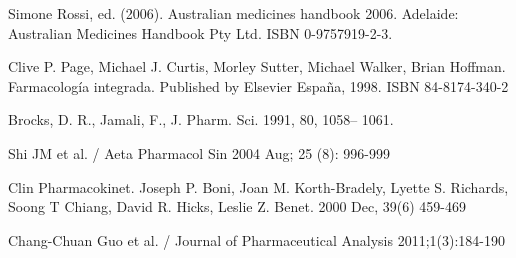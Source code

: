 \documentclass[12pt]{article} %
\begin{document}
\newpage

\begin{thebibliography}{100}
	Simone Rossi, ed. (2006).  Australian medicines handbook 2006. Adelaide: Australian Medicines Handbook Pty Ltd. ISBN 0-9757919-2-3.

	Clive P. Page, Michael J. Curtis, Morley Sutter, Michael Walker, Brian Hoffman. Farmacología integrada. Published by Elsevier España, 1998. ISBN 84-8174-340-2

	Brocks, D. R., Jamali, F., J. Pharm. Sci. 1991, 80, 1058– 1061.


        Shi JM et al. / Aeta Pharmacol Sin 2004 Aug; 25 (8): 996-999

        Clin Pharmacokinet. Joseph P. Boni, Joan M. Korth-Bradely, Lyette S. Richards, Soong T Chiang, David R. Hicks, Leslie Z. Benet. 2000 Dec, 39(6) 459-469

	Chang-Chuan Guo et al. / Journal of Pharmaceutical Analysis  2011;1(3):184-190

\end{thebibliography}
\end{document}
